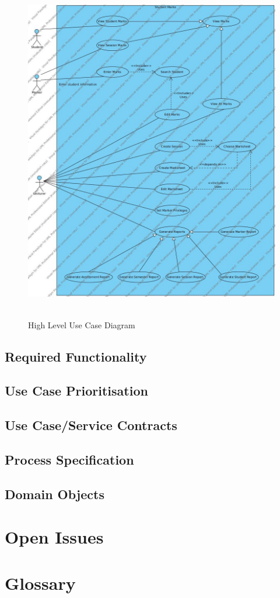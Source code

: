 \documentclass[a4paper]{article}
\begin{document}
			\begin{figure}[h]
				\caption{High Level Use Case Diagram}
				\includegraphics[height=15cm]{StudentMarks}
			\end{figure}

		\subsection{Required Functionality}

		\subsection{Use Case Prioritisation}

		\subsection{Use Case/Service Contracts}

		\subsection{Process Specification}

		\subsection{Domain Objects}

	\section{Open Issues}

	\section{Glossary}
\end{document}
